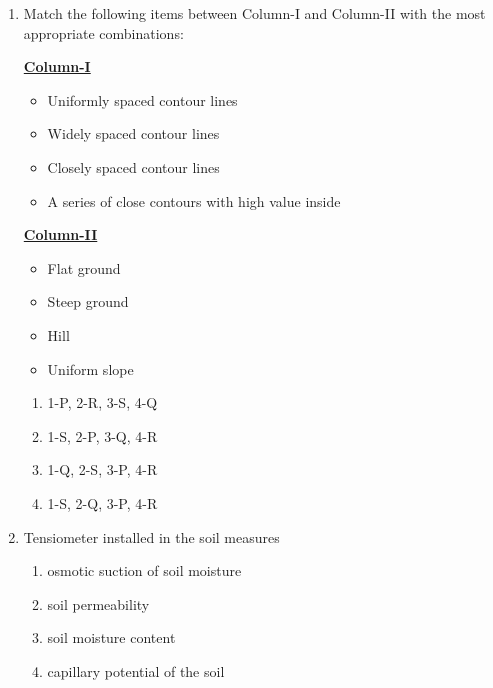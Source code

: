 \documentclass[12pt]{article}
\begin{document}
\begin{enumerate}[label=Q.\arabic*]
		\item Match the following items between Column-I and Column-II with the most appropriate combinations: 
			\begin{multicols}{2}
				\begin{center}{
						\textbf{\underline{Column-I}}
				}\end{center}
				\begin{itemize}
						\vspace{2pt}
					\item[1)] Uniformly spaced contour lines
					\item[2)] Widely spaced contour lines
					\item[3)] Closely spaced contour lines
					\item[4)] A series of close contours with high value inside
				\end{itemize}
				\begin{center}{
						\textbf{\underline{Column-II}}
				}\end{center}
				\begin{itemize}
					\item[P)] Flat ground
					\item[Q)] Steep ground
					\item[R)] Hill
					\item[S)] Uniform slope
				\end{itemize}
			\end{multicols}
			\begin{multicols}{4}
				\begin{enumerate}[label=(\Alph*)]
					\item 1-P, 2-R, 3-S, 4-Q
					\item 1-S, 2-P, 3-Q, 4-R
					\item 1-Q, 2-S, 3-P, 4-R
					\item 1-S, 2-Q, 3-P, 4-R
				\end{enumerate}
			\end{multicols}

		\item Tensiometer installed in the soil measures
			\begin{enumerate}[label=(\Alph*)]
				\item osmotic suction of soil moisture
				\item soil permeability
				\item soil moisture content
				\item capillary potential of the soil
			\end{enumerate}


\end{enumerate}
\end{document}
